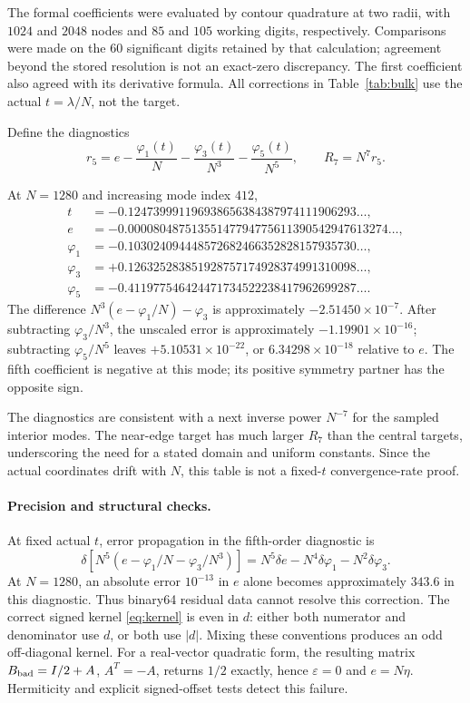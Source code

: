 \documentclass[10pt]{article}
\newcommand{\ph}{\varphi}
\begin{document}
The formal coefficients were evaluated by contour quadrature at two radii, with $1024$ and $2048$ nodes and $85$ and $105$ working digits, respectively. Comparisons were made on the $60$ significant digits retained by that calculation; agreement beyond the stored resolution is not an exact-zero discrepancy. The first coefficient also agreed with its derivative formula. All corrections in Table~\ref{tab:bulk} use the actual $t=\lambda/N$, not the target.

Define the diagnostics
\begin{equation}
 r_5=e-\frac{\ph_1(t)}N-\frac{\ph_3(t)}{N^3}-\frac{\ph_5(t)}{N^5},
 \qquad R_7=N^7r_5.
 \label{eq:diagnostic}
\end{equation}


At $N=1280$ and increasing mode index $412$,
\begin{align*}
 t&=-0.124739991196938656384387974111906293\ldots,\\
 e&=-0.00008048751355147794775611390542947613274\ldots,\\
 \ph_1&=-0.103024094448572682466352828157935730\ldots,\\
 \ph_3&=+0.126325283851928757174928374991310098\ldots,\\
 \ph_5&=-0.411977546424471734522238417962699287\ldots.
\end{align*}
The difference $N^3(e-\ph_1/N)-\ph_3$ is approximately $-2.51450\times10^{-7}$. After subtracting $\ph_3/N^3$, the unscaled error is approximately $-1.19901\times10^{-16}$; subtracting $\ph_5/N^5$ leaves $+5.10531\times10^{-22}$, or $6.34298\times10^{-18}$ relative to $e$. The fifth coefficient is negative at this mode; its positive symmetry partner has the opposite sign.

The diagnostics are consistent with a next inverse power $N^{-7}$ for the sampled interior modes. The near-edge target has much larger $R_7$ than the central targets, underscoring the need for a stated domain and uniform constants. Since the actual coordinates drift with $N$, this table is not a fixed-$t$ convergence-rate proof.

\paragraph{Precision and structural checks.}
At fixed actual $t$, error propagation in the fifth-order diagnostic is
\[
 \delta\!\left[N^5(e-\ph_1/N-\ph_3/N^3)\right]
 =N^5\delta e-N^4\delta\ph_1-N^2\delta\ph_3.
\]
At $N=1280$, an absolute error $10^{-13}$ in $e$ alone becomes approximately $343.6$ in this diagnostic. Thus binary64 residual data cannot resolve this correction. The correct signed kernel \eqref{eq:kernel} is even in $d$: either both numerator and denominator use $d$, or both use $|d|$. Mixing these conventions produces an odd off-diagonal kernel. For a real-vector quadratic form, the resulting matrix $B_{\rm bad}=I/2+A$, $A^T=-A$, returns $1/2$ exactly, hence $\varepsilon=0$ and $e=N\eta$. Hermiticity and explicit signed-offset tests detect this failure.
\end{document}
